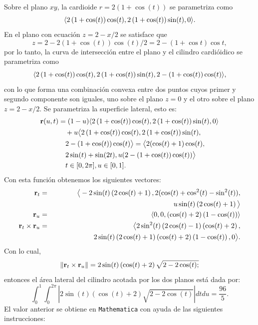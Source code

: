 Sobre el plano $xy$, la cardioide $r=2(1+\cos(t))$ se parametriza como
\[\langle 2\left( 1+\cos (t) \right) \cos (t) ,2\left(1+\cos (t) \right) \sin (t),0 \rangle.\]
En el plano con ecuación $z=2-x/2$ se satisface que
\[z=2-2\left( 1+\cos (t) \right) \cos(t) /2= 2-\left( 1+\cos t\right) \cos t,\]
por lo tanto, la curva de intersección entre el plano y el cilindro cardióidico se parametriza como
\[\langle 2\left(1+\cos(t)\right)\cos(t),2\left(1+\cos(t)\right)\sin(t),2-(1+\cos (t))\cos(t) \rangle,\]
con lo que forma una combinación convexa entre dos puntos cuyos primer y segundo componente son iguales, uno sobre el plano $z=0$ y el otro sobre el plano
$z=2-x/2$. Se parametriza la superficie lateral, esto es:
\begin{align*}
{\bf r}(u,t)&=(1-u) \langle 2\left( 1+\cos (t) \right) \cos (t) ,2\left( 1+\cos (t) \right) \sin (t) ,0\rangle \\
&\quad +u\big \langle 2\left( 1+\cos (t) \right) \cos(t) , 2\left( 1+\cos (t) \right) \sin (t),\\
&\quad 2-\left( 1+\cos (t) \right) \cos (t) \big \rangle = \big \langle 2( \cos (t)+1) \cos (t),\\
&\quad 2\sin (t)+\sin (2t), u(2-\left( 1+\cos (t) \right) \cos (t)) \big \rangle \\
&\quad t\in [0,2\pi], u\in [0,1].
\end{align*}
Con esta función obtenemos los siguientes vectores:
\begin{eqnarray*}
{\bf r}_{t} &=& \big \langle-2\sin (t) \left( 2\cos (t) +1\right) ,2(\cos(t)+\cos ^{2}(t)-\sin^{2}(t)) , \\
&& \hskip 6cm u\sin (t) \left( 2\cos (t)+1\right) \big \rangle \\
{\bf r}_{u} &=& \la 0,0,\left( \cos (t) +2\right) \left( 1-\cos (t) \right) \ra\\
{\bf r}_{t}\times {\bf r}_{u}&=&\big\langle 2\sin^{2}(t)\left( 2\cos(t) -1\right)\left(\cos(t)+2\right) ,\\
&&\hskip1.5cm 2\sin(t) \left( 2\cos (t) +1\right) \left( \cos (t) +2\right) \left( 1-\cos (t) \right) ,0\big \rangle.
\end{eqnarray*}
Con lo cual,
\[\left\| {\bf r}_{t}\times {\bf r}_{u}\right\| = 2\sin (t) \left( \cos (t) +2\right) \sqrt{2-2\cos(t);}\]
entonces el área lateral del cilindro acotada por los dos planos está dada por:
\[\int_{0}^{1}\int_{0}^{2\pi}\left|2\sin(t)\left(\cos(t)+2\right)\sqrt{2-2\cos(t)}\right|dtdu= \frac{96}{5}.\]
El valor anterior se obtiene en \verb"Mathematica" con ayuda de las siguientes instrucciones:

